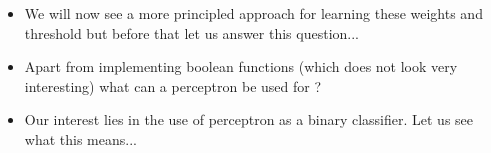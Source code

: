 \begin{frame}
\end{frame}

\begin{frame}
	\begin{itemize}\justifying
		\item<1-> We will now see a more principled approach for learning these weights and threshold but before that let us answer this question...
		\item<2-> Apart from implementing boolean functions (which does not look very interesting) what can a perceptron be used for ?
		\item<3-> Our interest lies in the use of perceptron as a binary classifier. Let us see what this means...
	\end{itemize}
\end{frame}

